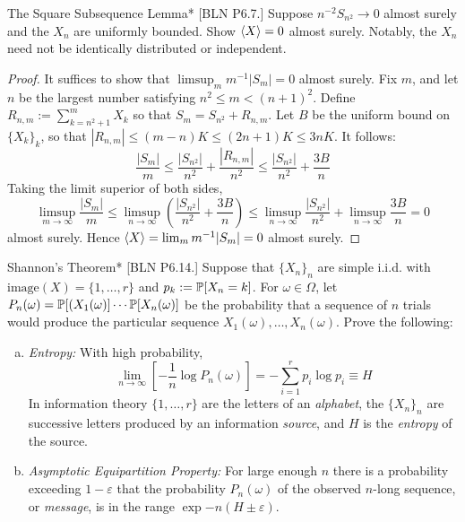 \begin{problem}{The Square Subsequence Lemma}*
    [BLN P6.7.] Suppose \(n^{-2} S_{n^2} \to 0\) almost surely and the \(X_n\) are uniformly bounded. Show \(\ev{X} = 0\) almost surely. Notably, the \(X_n\) need not be identically distributed or independent. 
\end{problem}

\begin{proof}
    It suffices to show that \(\limsup_m m^{-1} |S_m| = 0\) almost surely. Fix \(m\), and let \(n\) be the largest number satisfying \(n^2 \leq m < (n+1)^2\). Define \(R_{n,m} := \sum_{k=n^2+1}^m X_k\) so that \(S_m = S_{n^2} + R_{n,m}\). Let \(B\) be the uniform bound on \(\{X_k\}_k\), so that \(|R_{n,m}| \leq (m-n) K \leq (2n+1) K \leq 3nK\). It follows: 
    \[
        \frac{|S_m|}{m} \leq \frac{|S_{n^2}|}{n^2} + \frac{|R_{n,m}|}{n^2} \leq \frac{|S_{n^2}|}{n^2} + \frac{3B}{n}
    \]
    Taking the limit superior of both sides, 
    \[
        \limsup_{m \to \infty} \frac{|S_m|}{m} 
        \leq \limsup_{n \to \infty} \left( \frac{|S_{n^2}|}{n^2} + \frac{3B}{n} \right)
        \leq \limsup_{n \to \infty} \frac{|S_{n^2}|}{n^2} + \limsup_{n \to \infty} \frac{3B}{n}
        = 0
    \]
    almost surely. Hence \(\ev{X} = \lim_m m^{-1} |S_m| = 0\) almost surely. 
\end{proof}



\begin{problem}{Shannon's Theorem}*
    [BLN P6.14.] Suppose that \(\{X_n\}_n\) are simple i.i.d. with \(\text{image}(X) = \{1, \dots, r\}\) and \(p_k := \mathbb{P}[X_n = k]\). For \(\omega \in \Omega\), let \(P_n(\omega) = \mathbb{P}[(X_1(\omega)] \cdots \mathbb{P}[X_n(\omega)]\) be the probability that a sequence of \(n\) trials would produce the particular sequence \(X_1(\omega), \dots, X_n(\omega)\). Prove the following: 
    \begin{enumerate}[(a)]
        \itemsep0em
        \item \emph{Entropy:} With high probability, 
        \[
            \lim_{n \to \infty} \left[ - \frac{1}{n} \log P_n(\omega) \right] 
            = - \sum_{i=1}^r p_i \log p_i 
            \equiv H
        \]
        In information theory \(\{1, \dots, r\}\) are the letters of an \emph{alphabet}, the \(\{X_n\}_n\) are successive letters produced by an information \emph{source}, and \(H\) is the \emph{entropy} of the source. 
        \item \emph{Asymptotic Equipartition Property:} For large enough \(n\) there is a probability exceeding \(1 - \varepsilon\) that the probability \(P_n(\omega)\) of the observed \(n\)-long sequence, or \emph{message}, is in the range \(\exp{-n(H \pm \varepsilon)}\).
    \end{enumerate}
\end{problem}

